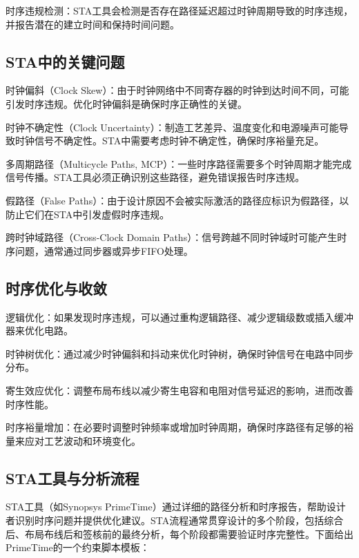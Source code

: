 时序违规检测：STA工具会检测是否存在路径延迟超过时钟周期导致的时序违规，并报告潜在的建立时间和保持时间问题。

\subsection{STA中的关键问题}\label{sec:16-chip-frontend-024}

时钟偏斜（Clock
Skew）：由于时钟网络中不同寄存器的时钟到达时间不同，可能引发时序违规。优化时钟偏斜是确保时序正确性的关键。

时钟不确定性（Clock
Uncertainty）：制造工艺差异、温度变化和电源噪声可能导致时钟信号不确定性。STA中需要考虑时钟不确定性，确保时序裕量充足。

多周期路径（Multicycle Paths,
MCP）：一些时序路径需要多个时钟周期才能完成信号传播。STA工具必须正确识别这些路径，避免错误报告时序违规。

假路径（False
Paths）：由于设计原因不会被实际激活的路径应标识为假路径，以防止它们在STA中引发虚假时序违规。

跨时钟域路径（Cross-Clock Domain
Paths）：信号跨越不同时钟域时可能产生时序问题，通常通过同步器或异步FIFO处理。

\subsection{时序优化与收敛}\label{sec:16-chip-frontend-025}

逻辑优化：如果发现时序违规，可以通过重构逻辑路径、减少逻辑级数或插入缓冲器来优化电路。

时钟树优化：通过减少时钟偏斜和抖动来优化时钟树，确保时钟信号在电路中同步分布。

寄生效应优化：调整布局布线以减少寄生电容和电阻对信号延迟的影响，进而改善时序性能。

时序裕量增加：在必要时调整时钟频率或增加时钟周期，确保时序路径有足够的裕量来应对工艺波动和环境变化。

\subsection{STA工具与分析流程}\label{sec:16-chip-frontend-026}

STA工具（如Synopsys
PrimeTime）通过详细的路径分析和时序报告，帮助设计者识别时序问题并提供优化建议。STA流程通常贯穿设计的多个阶段，包括综合后、布局布线后和签核前的最终分析，每个阶段都需要验证时序完整性。下面给出PrimeTime的一个约束脚本模板：


